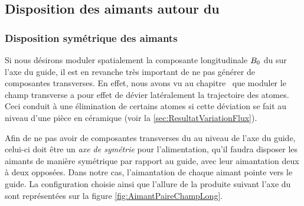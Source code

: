 \subsection{Disposition des aimants autour du \gm}

{
\subsubsection{Disposition symétrique des aimants}
Si nous désirons moduler spatialement la composante longitudinale ${B_0}$ du \chm sur l'axe du guide, il est en revanche très important de ne pas générer de composantes transverses. En effet, nous avons vu au chapitre~ que moduler le champ transverse a pour effet de dévier latéralement la trajectoire des atomes. Ceci conduit à une élimination de certains atomes si cette déviation se fait au niveau d'une pièce en céramique (voir la \autoref{sec:ResultatVariationFlux}).

Afin de ne pas avoir de composantes transverses du \chm au niveau de l'axe du guide, celui-ci doit être un \emph{axe de symétrie} pour l'alimentation, \cad qu'il faudra disposer les aimants de manière symétrique par rapport au guide, avec leur aimantation deux à deux opposées. Dans notre cas, l'aimantation de chaque aimant pointe vers le guide.
La configuration choisie ainsi que l'allure de la \bapot produite suivant l'axe du \gm sont représentées sur la figure \ref{fig:AimantPaireChampLong}.
}
\bfighs
{}
\label{fig:AimantPaireChampLong}
\efigh

\casse

